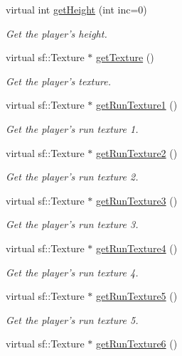 \begin{DoxyCompactItemize}
virtual int \hyperlink{class_player_af215d8b616713cbbb1ab6207d26fffde}{get\-Height} (int inc=0)
\begin{DoxyCompactList}\small\item\em Get the player's height. \end{DoxyCompactList}\item 
virtual sf\-::\-Texture $\ast$ \hyperlink{class_player_aa0452c12db96c7d4dd9fd3c93ad2bbb1}{get\-Texture} ()
\begin{DoxyCompactList}\small\item\em Get the player's texture. \end{DoxyCompactList}\item 
virtual sf\-::\-Texture $\ast$ \hyperlink{class_player_a5bdf81d3fb9358acae70ac51e818fa84}{get\-Run\-Texture1} ()
\begin{DoxyCompactList}\small\item\em Get the player's run texture 1. \end{DoxyCompactList}\item 
virtual sf\-::\-Texture $\ast$ \hyperlink{class_player_afd441d4a8f47d23eeb91b362d0da3533}{get\-Run\-Texture2} ()
\begin{DoxyCompactList}\small\item\em Get the player's run texture 2. \end{DoxyCompactList}\item 
virtual sf\-::\-Texture $\ast$ \hyperlink{class_player_aea67670a94415f077ac15f4dd85ea6e6}{get\-Run\-Texture3} ()
\begin{DoxyCompactList}\small\item\em Get the player's run texture 3. \end{DoxyCompactList}\item 
virtual sf\-::\-Texture $\ast$ \hyperlink{class_player_a8d9efc602e8feb4dbb64535ed4e110bd}{get\-Run\-Texture4} ()
\begin{DoxyCompactList}\small\item\em Get the player's run texture 4. \end{DoxyCompactList}\item 
virtual sf\-::\-Texture $\ast$ \hyperlink{class_player_a9933563897756d9066b0a700978d91ec}{get\-Run\-Texture5} ()
\begin{DoxyCompactList}\small\item\em Get the player's run texture 5. \end{DoxyCompactList}\item 
virtual sf\-::\-Texture $\ast$ \hyperlink{class_player_a4869df8bb0be21e6c6f84fb708d01fa5}{get\-Run\-Texture6} ()

\end{DoxyCompactItemize}
